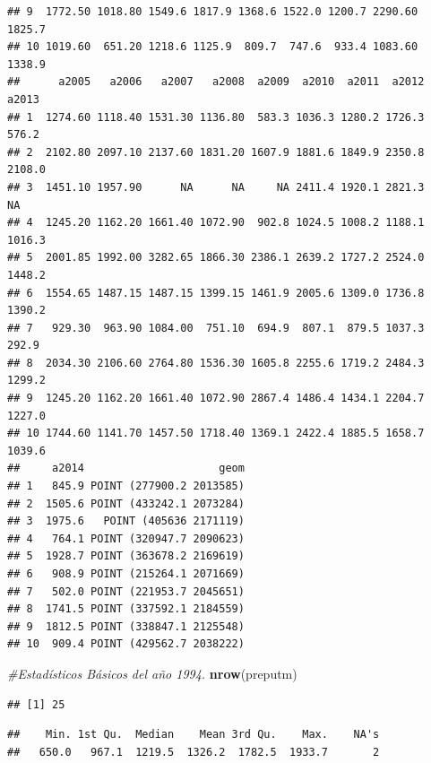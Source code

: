\documentclass[11pt,]{article}
\newenvironment{Shaded}{\begin{snugshade}}{\end{snugshade}}
\newcommand{\KeywordTok}[1]{\textcolor[rgb]{0.13,0.29,0.53}{\textbf{#1}}}
\newcommand{\CommentTok}[1]{\textcolor[rgb]{0.56,0.35,0.01}{\textit{#1}}}
\newcommand{\OperatorTok}[1]{\textcolor[rgb]{0.81,0.36,0.00}{\textbf{#1}}}
\newcommand{\NormalTok}[1]{#1}
\begin{document}
\begin{verbatim}
## 9  1772.50 1018.80 1549.6 1817.9 1368.6 1522.0 1200.7 2290.60 1825.7
## 10 1019.60  651.20 1218.6 1125.9  809.7  747.6  933.4 1083.60 1338.9
##      a2005   a2006   a2007   a2008  a2009  a2010  a2011  a2012  a2013
## 1  1274.60 1118.40 1531.30 1136.80  583.3 1036.3 1280.2 1726.3  576.2
## 2  2102.80 2097.10 2137.60 1831.20 1607.9 1881.6 1849.9 2350.8 2108.0
## 3  1451.10 1957.90      NA      NA     NA 2411.4 1920.1 2821.3     NA
## 4  1245.20 1162.20 1661.40 1072.90  902.8 1024.5 1008.2 1188.1 1016.3
## 5  2001.85 1992.00 3282.65 1866.30 2386.1 2639.2 1727.2 2524.0 1448.2
## 6  1554.65 1487.15 1487.15 1399.15 1461.9 2005.6 1309.0 1736.8 1390.2
## 7   929.30  963.90 1084.00  751.10  694.9  807.1  879.5 1037.3  292.9
## 8  2034.30 2106.60 2764.80 1536.30 1605.8 2255.6 1719.2 2484.3 1299.2
## 9  1245.20 1162.20 1661.40 1072.90 2867.4 1486.4 1434.1 2204.7 1227.0
## 10 1744.60 1141.70 1457.50 1718.40 1369.1 2422.4 1885.5 1658.7 1039.6
##     a2014                     geom
## 1   845.9 POINT (277900.2 2013585)
## 2  1505.6 POINT (433242.1 2073284)
## 3  1975.6   POINT (405636 2171119)
## 4   764.1 POINT (320947.7 2090623)
## 5  1928.7 POINT (363678.2 2169619)
## 6   908.9 POINT (215264.1 2071669)
## 7   502.0 POINT (221953.7 2045651)
## 8  1741.5 POINT (337592.1 2184559)
## 9  1812.5 POINT (338847.1 2125548)
## 10  909.4 POINT (429562.7 2038222)
\end{verbatim}

\begin{Shaded}
\begin{Highlighting}[]
\CommentTok{#Estadísticos Básicos del año 1994.}
\KeywordTok{nrow}\NormalTok{(preputm)}
\end{Highlighting}
\end{Shaded}

\begin{verbatim}
## [1] 25
\end{verbatim}

\begin{Shaded}
\end{Shaded}

\begin{verbatim}
##    Min. 1st Qu.  Median    Mean 3rd Qu.    Max.    NA's 
##   650.0   967.1  1219.5  1326.2  1782.5  1933.7       2
\end{verbatim}
\end{document}
